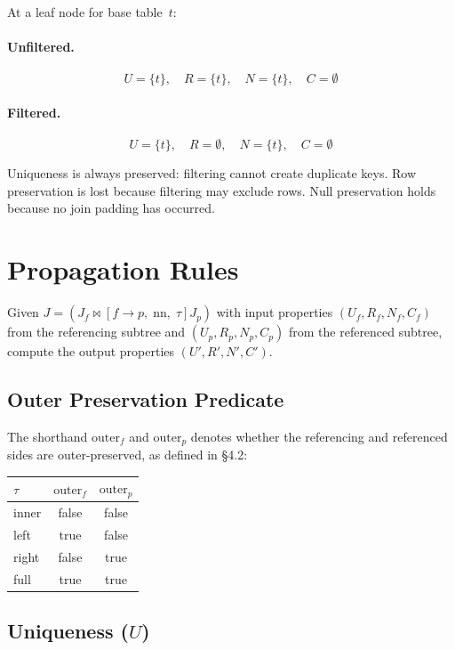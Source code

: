 \documentclass[11pt]{article}
\theoremstyle{definition}
\newcommand{\joins}{\bowtie}
\newcommand{\fkjoin}[1]{\joins\![#1]}
\newcommand{\set}[1]{\{#1\}}
\newcommand{\Uf}{U_f}
\newcommand{\Up}{U_p}
\newcommand{\Rf}{R_f}
\newcommand{\Rp}{R_p}
\newcommand{\Nf}{N_f}
\newcommand{\Np}{N_p}
\newcommand{\Cf}{C_f}
\newcommand{\Cp}{C_p}
\newcommand{\Jf}{J_f}
\newcommand{\Jp}{J_p}
\newcommand{\outerf}{\mathrm{outer}_f}
\newcommand{\outerp}{\mathrm{outer}_p}
\newcommand{\nn}{\mathrm{nn}}
\begin{document}
At a leaf node for base table~$t$:

\paragraph{Unfiltered.}
\[
  U = \set{t},\quad R = \set{t},\quad N = \set{t},\quad C = \emptyset
\]

\paragraph{Filtered.}
\[
  U = \set{t},\quad R = \emptyset,\quad N = \set{t},\quad C = \emptyset
\]

Uniqueness is always preserved: filtering cannot create duplicate
keys.  Row preservation is lost because filtering may exclude rows.
Null preservation holds because no join padding has occurred.


\section{Propagation Rules}

Given $J = (\Jf \fkjoin{f \to p,\;\nn,\;\tau} \Jp)$ with input
properties $(\Uf, \Rf, \Nf, \Cf)$ from the referencing subtree and
$(\Up, \Rp, \Np, \Cp)$ from the referenced subtree, compute the
output properties $(U', R', N', C')$.


\subsection{Outer Preservation Predicate}

The shorthand $\outerf$ and $\outerp$ denotes whether the
referencing and referenced sides are outer-preserved, as defined in
\S4.2:

\begin{center}
\begin{tabular}{lcc}
\toprule
$\tau$ & $\outerf$ & $\outerp$ \\
\midrule
inner & false & false \\
left  & true  & false \\
right & false & true  \\
full  & true  & true  \\
\bottomrule
\end{tabular}
\end{center}


\subsection{Uniqueness (\texorpdfstring{$U$}{U})}
\end{document}
